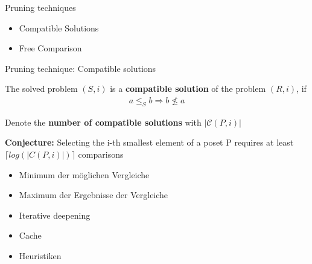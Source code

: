 \begin{frame}{Pruning techniques}
  \begin{itemize}
    \item Compatible Solutions
    \item Free Comparison
  \end{itemize}
\end{frame}

\begin{frame}{Pruning technique: Compatible solutions}

  The solved problem $(S,i)$ is a \textbf{compatible solution} of the problem $(R,i)$, if
  \begin{align*}
    a \leq_S b \Rightarrow b \not \leq a
  \end{align*}
  \vspace{1mm}

  Denote the \textbf{number of compatible solutions} with $\vert \mathcal{C}(P,i) \vert $\\
  \vspace{5mm}

  \textbf{Conjecture: } Selecting the i-th smallest element of a poset P requires at least $\lceil log (|C(P, i)|) \rceil $ comparisons
\end{frame}




\begin{frame}{\insertsection}
  \begin{itemize}
    \item<1-> Minimum der möglichen Vergleiche
    \item<1-> Maximum der Ergebnisse der Vergleiche
    \item<2-> Iterative deepening
    \item<3-> Cache
    \item<4-> Heuristiken
  \end{itemize}
\end{frame}


